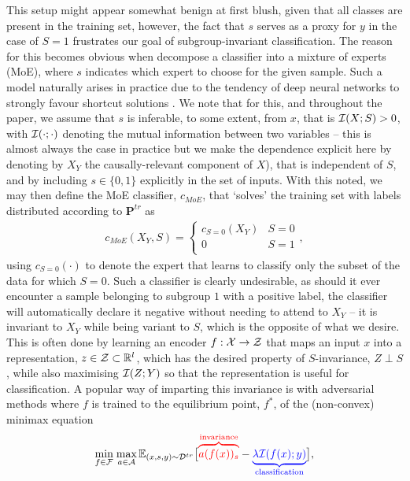 %
This setup might appear somewhat benign at first blush, given that all classes are present in the
training set, however, the fact that \(s\) serves as a proxy for \(y\) in the case of $S=1$
frustrates our goal of subgroup-invariant classification. 
%
The reason for this becomes obvious when decompose a classifier into a mixture of experts (MoE),
where \(s\) indicates which expert to choose for the given sample. 
%
Such a model naturally arises in practice due to the tendency of deep neural networks to strongly
favour shortcut solutions \citep{geirhos2020shortcut}.
%
We note that for this, and throughout the paper, we assume that \(s\) is inferable, to some extent,
from $x$, that is \( {\mathcal{I}}(X; S) > 0 \), with \( {\mathcal{I}}(\cdot; \cdot) \) denoting the mutual information
between two variables -- this is almost always the case in practice but we make the dependence
explicit here by denoting by \( X_Y \) the causally-relevant component of \( X \)), that is
independent of \(S\), and by including \( s \in \{0, 1\} \) explicitly in the set of inputs.
%
With this noted, we may then define the MoE classifier, \(c_{MoE}\), that `solves' the training set
with labels distributed according to \( \mathbf{P}^{tr} \) as
%
\begin{align}
  c_{MoE}(X_Y, S) = \begin{cases}
c_{S=0}(X_Y) &S=0 \\
0 &S=1 \\
\end{cases},
\end{align}
%
using \(c_{S=0}(\cdot)\) to denote the expert that learns to classify only the subset of the data
for which $S=0$.
%
Such a classifier is clearly undesirable, as should it ever encounter a sample belonging to
subgroup $1$ with a positive label, the classifier will automatically declare it negative without
needing to attend to $X_Y$ -- it is invariant to $X_Y$ while being variant to \(S\), which is the
opposite of what we desire. 
%
This is often done by learning an encoder $f: {\mathcal{X}} \to {\mathcal{Z}}$ that maps an input $x$ into a
representation, \( z \in {\mathcal{Z}} \subset \mathbb{R}^l \), which has the desired property of \(S\)-invariance,
\( Z \perp S \), while also maximising ${\mathcal{I}}(Z; Y)$ so that the representation is useful for
classification. 
%
A popular way of imparting this invariance is with adversarial methods \citep{ganin2016domain,
zhao2018adversarial, madras2018learning} where  $f$ is trained to the equilibrium point, $f^\ast$,
of the (non-convex) minimax equation 
%
\begin{align}\label{eq:moo}
\underset{f \in {\mathcal{F}}}{\text{min}}\; \underset{a \in {\mathcal{A}}}{\text{max}}\,
\mathbb{E}_{(x, s, y) \sim {\mathcal{D}}^{tr}}
\big[ 
  \textcolor{red}{ \overbrace{ a(f(x))_s }^{ \text{invariance}} }
  - \textcolor{blue}{ \underbrace{ \lambda {\mathcal{I}}(f(x); y) }_{ \text{classification} } }
\big],
\end{align}
